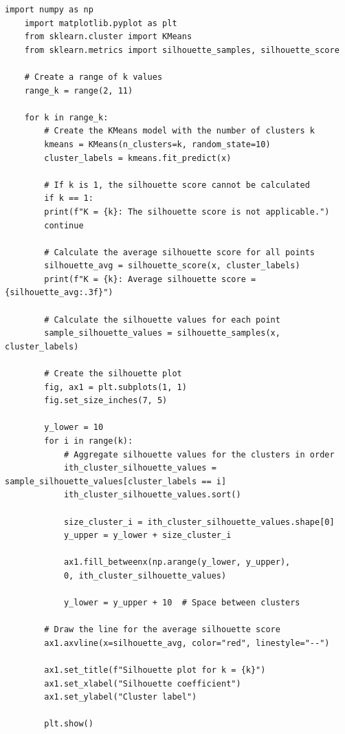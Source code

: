 \documentclass{article}
\begin{document}
\begin{lstlisting}[style=mypython, label=fig:pca_code, caption=Implementation of Silhouette Analysis for Clustering Evaluation]
	import numpy as np
	import matplotlib.pyplot as plt
	from sklearn.cluster import KMeans
	from sklearn.metrics import silhouette_samples, silhouette_score
	
	# Create a range of k values
	range_k = range(2, 11)
	
	for k in range_k:
		# Create the KMeans model with the number of clusters k
		kmeans = KMeans(n_clusters=k, random_state=10)
		cluster_labels = kmeans.fit_predict(x)
	
		# If k is 1, the silhouette score cannot be calculated
		if k == 1:
		print(f"K = {k}: The silhouette score is not applicable.")
		continue
		
		# Calculate the average silhouette score for all points
		silhouette_avg = silhouette_score(x, cluster_labels)
		print(f"K = {k}: Average silhouette score = {silhouette_avg:.3f}")
		
		# Calculate the silhouette values for each point
		sample_silhouette_values = silhouette_samples(x, cluster_labels)
		
		# Create the silhouette plot
		fig, ax1 = plt.subplots(1, 1)
		fig.set_size_inches(7, 5)
		
		y_lower = 10
		for i in range(k):
			# Aggregate silhouette values for the clusters in order
			ith_cluster_silhouette_values = sample_silhouette_values[cluster_labels == i]
			ith_cluster_silhouette_values.sort()
			
			size_cluster_i = ith_cluster_silhouette_values.shape[0]
			y_upper = y_lower + size_cluster_i
		
			ax1.fill_betweenx(np.arange(y_lower, y_upper),
			0, ith_cluster_silhouette_values)
			
			y_lower = y_upper + 10  # Space between clusters
		
		# Draw the line for the average silhouette score
		ax1.axvline(x=silhouette_avg, color="red", linestyle="--")
		
		ax1.set_title(f"Silhouette plot for k = {k}")
		ax1.set_xlabel("Silhouette coefficient")
		ax1.set_ylabel("Cluster label")
		
		plt.show()
\end{lstlisting}
\end{document}
